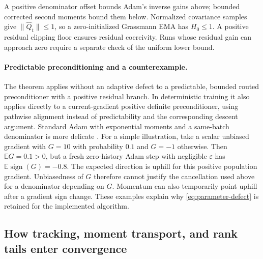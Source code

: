 A positive denominator offset bounds Adam's inverse gains above; bounded
corrected second moments bound them below. Normalized covariance samples
give $\|\widehat Q_t\|\le1$, so a zero-initialized Grassmann EMA has
$H_0\le1$. A positive residual clipping floor ensures residual coercivity.
Runs whose residual gain can approach zero require a separate check of
the uniform lower bound.

\paragraph{Predictable preconditioning and a counterexample.}
The theorem applies without an adaptive defect to a predictable, bounded
routed preconditioner with a positive residual branch. In deterministic
training it also applies directly to a current-gradient positive definite
preconditioner, using pathwise alignment instead of predictability and the
corresponding descent argument. Standard Adam with exponential moments and
a same-batch denominator is more delicate \cite{reddi2018adam,chen2019adamtype}.
For a simple illustration, take a scalar unbiased gradient with
$G=10$ with probability $0.1$ and $G=-1$ otherwise. Then
$\mathbb EG=0.1>0$, but a fresh zero-history Adam step with negligible
$\varepsilon$ has $\mathbb E\operatorname{sign}(G)=-0.8$.
The expected direction is uphill for this positive population gradient.
Unbiasedness of $G$ therefore cannot justify the cancellation used above
for a denominator depending on $G$. Momentum can also temporarily point
uphill after a gradient sign change. These examples explain why
\eqref{eq:parameter-defect} is retained for the implemented algorithm.

\subsection{How tracking, moment transport, and rank tails enter convergence}


